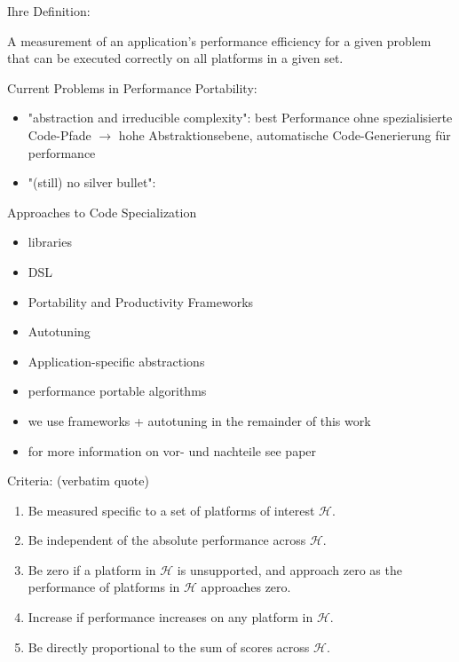 Ihre Definition:
\begin{quotebox}{\cite{pennycook_implications_2019}}
    A measurement of an application’s performance efficiency for a given problem that can be executed correctly on all platforms in a given set.
\end{quotebox}


Current Problems in Performance Portability:
\begin{itemize}
    \item "abstraction and irreducible complexity": best Performance ohne spezialisierte Code-Pfade $\rightarrow$ hohe Abstraktionsebene, automatische Code-Generierung für performance
    \item "(still) no silver bullet": 
\end{itemize}

Approaches to Code Specialization
\begin{itemize}
    \item libraries
    \item DSL
    \item Portability and Productivity Frameworks
    \item Autotuning
    \item Application-specific abstractions
    \item performance portable algorithms

    \item we use frameworks + autotuning in the remainder of this work
    \item for more information on vor- und nachteile see paper \cite{pennycook_implications_2019}
\end{itemize}

Criteria: (verbatim quote)
\begin{enumerate}
    \item Be measured specific to a set of platforms of interest $\mathcal{H}$.
    \item Be independent of the absolute performance across $\mathcal{H}$.
    \item Be zero if a platform in $\mathcal{H}$ is unsupported, and approach zero as the performance of platforms in $\mathcal{H}$ approaches zero. 
    \item Increase if performance increases on any platform in $\mathcal{H}$.
    \item Be directly proportional to the sum of scores across $\mathcal{H}$.
\end{enumerate}


